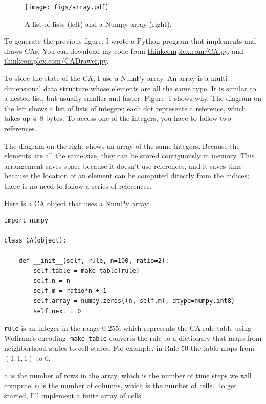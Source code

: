 \documentclass[10pt]{book}
\begin{document}
\begin{figure}
\centerline{\texttt{[image: figs/array.pdf]}}
\caption{A list of lists (left) and a Numpy array (right).\label{fig.array}}
\end{figure}

To generate the previous figure, I wrote a Python program that
implements and draws CAs.
You can download my code from \url{thinkcomplex.com/CA.py}.
and \url{thinkcomplex.com/CADrawer.py}.

To store the state of the CA, I use a NumPy array.  An array is a
multi-dimensional data structure whose elements are all the same type.
It is similar to a nested list, but usually smaller and faster.  
Figure~\ref{fig.array} shows why.
The diagram on the left shows a list of lists of integers; each
dot represents a reference, which takes up 4--8 bytes.  To access
one of the integers, you have to follow two references.

The diagram on the right shows an array of the same integers.  Because
the elements are all the same size, they can be stored contiguously in
memory.  This arrangement saves space because it doesn't use
references, and it saves time because the location of an element can
be computed directly from the indices; there is no need to follow a
series of references.

Here is a CA object that uses a NumPy array:

\begin{verbatim}
import numpy

class CA(object):

    def __init__(self, rule, n=100, ratio=2):
        self.table = make_table(rule)
        self.n = n
        self.m = ratio*n + 1
        self.array = numpy.zeros((n, self.m), dtype=numpy.int8)
        self.next = 0
\end{verbatim}

{\tt rule} is an integer in the range 0-255, which represents the
CA rule table using Wolfram's encoding.  \verb"make_table" converts
the rule to a dictionary that maps from neighborhood states to cell
states.  For example, in Rule 50 the table maps from
$(1,1,1)$ to 0.

{\tt n} is the number of rows in the array, which is the number
of time steps we will compute.  {\tt m} is the number of columns,
which is the number of cells.  To get started, I'll implement
a finite array of cells.
\end{document}
